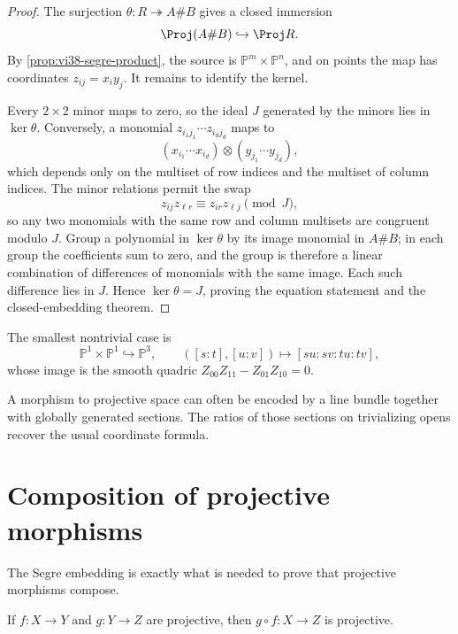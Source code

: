 \begin{proof}
The surjection \(\theta:R\twoheadrightarrow A\#B\) gives a closed immersion
\[
  \Proj(A\#B)\hookrightarrow\Proj R.
\]
By \cref{prop:vi38-segre-product}, the source is \(\mathbb P^m\times\mathbb P^n\), and on points the map has coordinates \(z_{ij}=x_i y_j\).  It remains to identify the kernel.

Every \(2\times2\) minor maps to zero, so the ideal \(J\) generated by the minors lies in \(\ker\theta\).  Conversely, a monomial \(z_{i_1j_1}\cdots z_{i_dj_d}\) maps to
\[
  (x_{i_1}\cdots x_{i_d})\otimes(y_{j_1}\cdots y_{j_d}),
\]
which depends only on the multiset of row indices and the multiset of column indices.  The minor relations permit the swap
\[
  z_{ij}z_{\ell r}\equiv z_{ir}z_{\ell j}\pmod J,
\]
so any two monomials with the same row and column multisets are congruent modulo \(J\).  Group a polynomial in \(\ker\theta\) by its image monomial in \(A\#B\); in each group the coefficients sum to zero, and the group is therefore a linear combination of differences of monomials with the same image.  Each such difference lies in \(J\).  Hence \(\ker\theta=J\), proving the equation statement and the closed-embedding theorem.
\end{proof}



The smallest nontrivial case is
\[
  \mathbb P^1\times\mathbb P^1\hookrightarrow\mathbb P^3,
  \qquad
  ([s:t],[u:v])\longmapsto[su:sv:tu:tv],
\]
whose image is the smooth quadric \(Z_{00}Z_{11}-Z_{01}Z_{10}=0\).

\begin{example}\label{ex:vi38-expand-03}
A morphism to projective space can often be encoded by a line bundle together with globally generated sections.  The ratios of those sections on trivializing opens recover the usual coordinate formula.
\end{example}
\section{Composition of projective morphisms}
The Segre embedding is exactly what is needed to prove that projective morphisms compose.

\begin{theorem}\label{thm:vi38-projective-composition}
If \(f:X\to Y\) and \(g:Y\to Z\) are projective, then \(g\circ f:X\to Z\) is projective.
\end{theorem}

